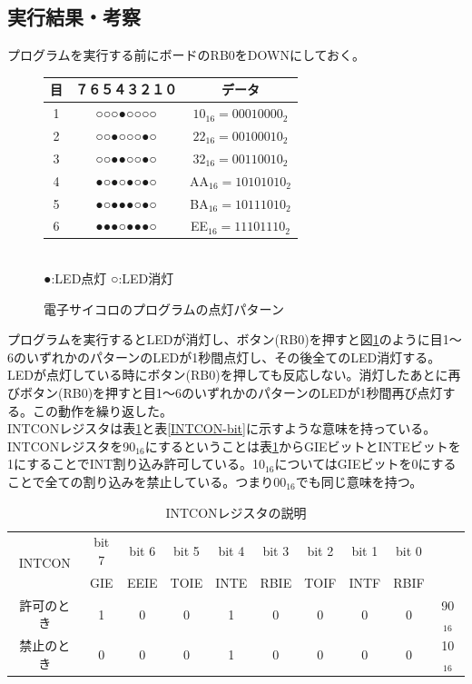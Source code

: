 \documentclass[a4paper,12pt]{ujarticle}
\begin{document}
  \subsection{実行結果・考察}
  プログラムを実行する前にボードのRB0をDOWNにしておく。
    \begin{figure}[htbp]
     \begin{center}
       \begin{tabular}{c|c|c}\hline
        目&７６５４３２１０ & データ \\ \hline
         1&○○○●○○○○ & $10_{16}=00010000_2$ \\
         2&○○●○○○●○ & $22_{16}=00100010_2$\\
         3&○○●●○○●○ & $32_{16}=00110010_2$\\
         4&●○●○●○●○ & AA$_{16}=10101010_2$\\
         5&●○●●●○●○ & BA$_{16}=10111010_2$\\
         6&●●●○●●●○ & EE$_{16}=11101110_2$\\ \hline
       \end{tabular}\\
      ●:LED点灯 ○:LED消灯
      \caption{電子サイコロのプログラムの点灯パターン}
      \label{fig:out_5-13}
     \end{center}
    \end{figure}

    プログラムを実行するとLEDが消灯し、ボタン(RB0)を押すと図\ref{fig:out_5-13}のように目1〜6のいずれかのパターンのLEDが1秒間点灯し、その後全てのLED消灯する。
    LEDが点灯している時にボタン(RB0)を押しても反応しない。消灯したあとに再びボタン(RB0)を押すと目1〜6のいずれかのパターンのLEDが1秒間再び点灯する。この動作を繰り返した。\\

    INTCONレジスタは表\ref{INTCON}と表\ref{INTCON-bit}に示すような意味を持っている。
    INTCONレジスタを90$_{16}$にするということは表\ref{INTCON}からGIEビットとINTEビットを
    1にすることでINT割り込み許可している。10$_{16}$についてはGIEビットを0にすることで全ての割り込みを禁止している。つまり00$_{16}$でも同じ意味を持つ。

    \begin{table}[htbp]
     \begin{center}
      \caption{INTCONレジスタの説明}
      \label{INTCON}
      \begin{tabular}{|c|c|c|c|c|c|c|c|c|c|}\hline
       \multirow{2}{*}{INTCON} &bit 7&bit 6&bit 5&bit 4&bit 3&bit 2&bit 1&bit 0& \\ \cline{2-9}
       &GIE&EEIE&TOIE&INTE&RBIE&TOIF&INTF&RBIF& \\ \hline
       許可のとき&1&0&0&1&0&0&0&0&90$_{16}$ \\
       禁止のとき&0&0&0&1&0&0&0&0&10$_{16}$ \\ \hline
      \end{tabular}
     \end{center}
    \end{table}
\end{document}
